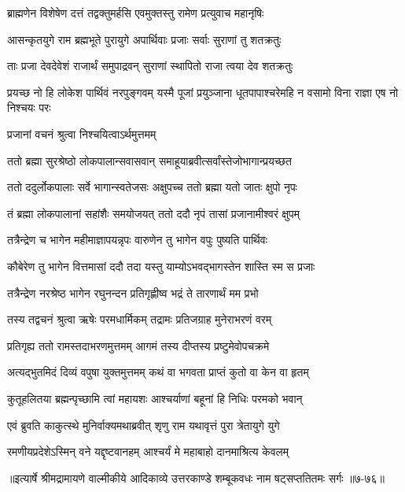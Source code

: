\twolineshloka
{ब्राह्मणेन विशेषेण दत्तं तद्वक्तुमर्हसि}
{एवमुक्तस्तु रामेण प्रत्युवाच महानृषिः} %

\twolineshloka
{आसन्कृतयुगे राम ब्रह्मभूते पुरायुगे}
{अपार्थिवाः प्रजाः सर्वाः सुराणां तु शतक्रतुः} %

\twolineshloka
{ताः प्रजा देवदेवेशं राजार्थं समुपाद्रवन्}
{सुराणां स्थापितो राजा त्वया देव शतक्रतुः} %

\threelineshloka
{प्रयच्छ नो हि लोकेश पार्थिवं नरपुङ्गवम्}
{यस्मै पूजां प्रयुञ्जाना धूतपापाश्चरेमहि}
{न वसामो विना राज्ञा एष नो निश्चयः परः} %

\onelineshloka
{प्रजानां वचनं श्रुत्वा निश्चयित्वाऽर्थमुत्तमम्} %

\twolineshloka
{ततो ब्रह्मा सुरश्रेष्ठो लोकपालान्सवासवान्}
{समाहूयाब्रवीत्सर्वांस्तेजोभागान्प्रयच्छत} %

\twolineshloka
{ततो ददुर्लोकपालाः सर्वे भागान्स्वतेजसः}
{अक्षुपच्च ततो ब्रह्मा यतो जातः क्षुपो नृपः} %

\twolineshloka
{तं ब्रह्मा लोकपालानां सहांशैः समयोजयत्}
{ततो ददौ नृपं तासां प्रजानामीश्वरं क्षुपम्} %

\twolineshloka
{तत्रैन्द्रेण च भागेन महीमाज्ञापयन्नृपः}
{वारुणेन तु भागेन वपुः पुष्यति पार्थिवः} %

\twolineshloka
{कौबेरेण तु भागेन वित्तमासां ददौ तदा}
{यस्तु याम्योऽभवद्भागस्तेन शास्ति स्म स प्रजाः} %

\twolineshloka
{तत्रैन्द्रेण नरश्रेष्ठ भागेन रघुनन्दन}
{प्रतिगृह्णीष्व भद्रं ते तारणार्थं मम प्रभो} %

\twolineshloka
{तस्य तद्वचनं श्रुत्वा ऋषेः परमधार्मिकम्}
{तद्रामः प्रतिजग्राह मुनेराभरणं वरम्} %

\twolineshloka
{प्रतिगृह्य ततो रामस्तदाभरणमुत्तमम्}
{आगमं तस्य दीप्तस्य प्रष्टुमेवोपचक्रमे} %

\twolineshloka
{अत्यद्भुतमिदं दिव्यं वपुषा युक्तमुत्तमम्}
{कथं वा भगवता प्राप्तं कुतो वा केन वा हृतम्} %

\twolineshloka
{कुतूहलितया ब्रह्मन्पृच्छामि त्वां महायशः}
{आश्चर्याणां बहूनां हि निधिः परमको भवान्} %

\twolineshloka
{एवं ब्रुवति काकुत्स्थे मुनिर्वाक्यमथाब्रवीत्}
{शृणु राम यथावृत्तं पुरा त्रेतायुगे युगे} %

\twolineshloka
{रमणीयप्रदेशेऽस्मिन् वने यद्दृष्टवानहम्}
{आश्चर्यं मे महाबाहो दानमाश्रित्य केवलम्} %


॥इत्यार्षे श्रीमद्रामायणे वाल्मीकीये आदिकाव्ये उत्तरकाण्डे शम्बूकवधः नाम षट्सप्ततितमः सर्गः ॥७-७६॥
